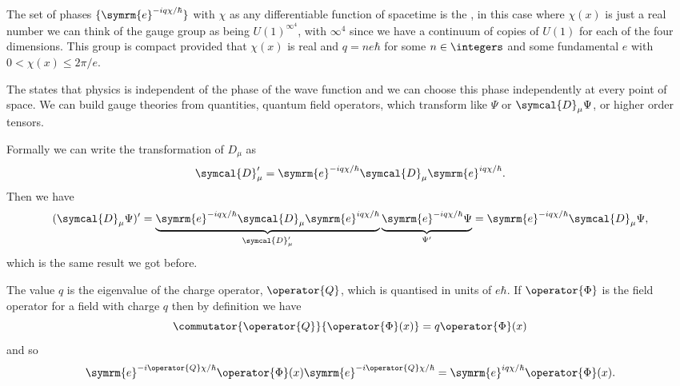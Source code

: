 \documentclass[fleqn]{NotesClass}
\newcommand{\e}{\symrm{e}}
\newcommand{\covariantDerivative}{\symcal{D}}
\begin{document}
    The set of phases \(\{\e^{-iq\chi/\hbar}\}\) with \(\chi\) as any differentiable function of spacetime is the , in this case where \(\chi(x)\) is just a real number we can think of the gauge group as being \(U(1)^{\infty^4}\), with \(\infty^4\) since we have a continuum of copies of \(U(1)\) for each of the four dimensions.
    This group is compact provided that \(\chi(x)\) is real and \(q = ne\hbar\) for some \(n \in \integers\) and some fundamental  \(e\) with \(0 < \chi(x) \le 2\pi/e\).
    
    The  states that physics is independent of the phase of the wave function and we can choose this phase independently at every point of space.
    We can build gauge theories from quantities, quantum field operators, which transform like \(\Psi\) or \(\covariantDerivative_\mu \Psi\), or higher order tensors.
    
    Formally we can write the transformation of \(D_\mu\) as
    \begin{equation}
        \covariantDerivative_\mu' = \e^{-iq\chi/\hbar}\covariantDerivative_\mu \e^{iq\chi/\hbar}.
    \end{equation}
    Then we have
    \begin{equation}
        (\covariantDerivative_\mu \Psi)' = \underbrace{\e^{-iq\chi/\hbar} \covariantDerivative_\mu \e^{iq\chi/\hbar}}_{\covariantDerivative_\mu'} \underbrace{\vphantom{\covariantDerivative_\mu} \e^{-iq\chi/\hbar} \Psi}_{\Psi'} = \e^{-iq\chi/\hbar} \covariantDerivative_\mu \Psi,
    \end{equation}
    which is the same result we got before.
    
    The value \(q\) is the eigenvalue of the charge operator, \(\operator{Q}\), which is quantised in units of \(e\hbar\).
    If \(\operator{\Phi}\) is the field operator for a field with charge \(q\) then by definition we have
    \begin{equation}
        \commutator{\operator{Q}}{\operator{\Phi}(x)} = q\operator{\Phi}(x)
    \end{equation}
    and so
    \begin{equation}
        \e^{-i\operator{Q}\chi/\hbar} \operator{\Phi}(x) \e^{-i\operator{Q}\chi/\hbar} = \e^{iq\chi/\hbar}\operator{\Phi}(x).
    \end{equation}
    
\end{document}
